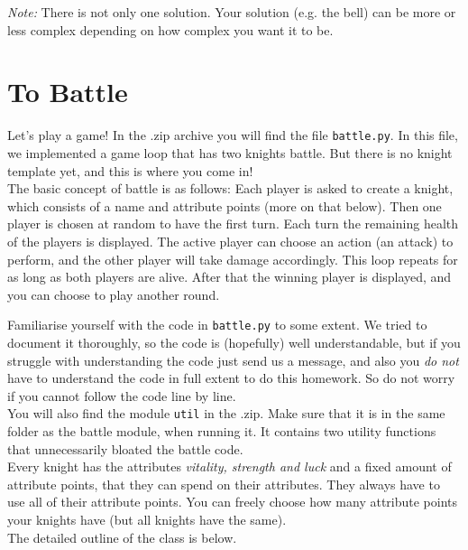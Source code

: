 \noindent\textit{Note:} There is not only one solution. Your solution (e.g. the bell) can
be more or less complex depending on how complex you want it to be.

\section{To Battle}
Let's play a game! In the .zip archive you will find the file \texttt{battle.py}.
In this file, we implemented a game loop that has two knights battle. But there
is no knight template yet, and this is where you come in!\\
The basic concept of battle is as follows: Each player is asked to create a knight,
which consists of a name and attribute points (more on that below). Then one player
is chosen at random to have the first turn. Each turn the remaining health of the
players is displayed. The active player can choose an action (an attack)
to perform, and the other player will take damage accordingly. This loop repeats
for as long as both players are alive. After that the winning player is displayed,
and you can choose to play another round.

\noindent Familiarise yourself with the code in \texttt{battle.py} to some extent. We tried to
document it thoroughly, so the code is (hopefully) well understandable, but if you
struggle with understanding the code just send us a message, and also you
\textit{do not} have to understand the code in full extent to do this homework. So do not
worry if you cannot follow the code line by line.\\
You will also find the module \texttt{util} in the .zip. Make sure that it is in the same folder
as the battle module, when running it. It contains two utility functions that unnecessarily
bloated the battle code.\\

\noindent Every knight has the attributes \textit{vitality, strength and luck} and a
fixed amount of attribute points, that they can spend on their attributes.
They always have to use all of their attribute points. You can freely
choose how many attribute points your knights have (but all knights have the same).\\
The detailed outline of the class is below.\\

